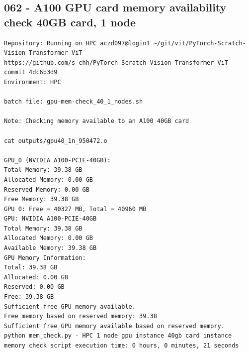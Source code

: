 \subsection{062 - A100 GPU card memory availability check 40GB card, 1 node}
\label{app_res:062}
\begin{verbatim}
Repository: Running on HPC aczd097@login1 ~/git/vit/PyTorch-Scratch-Vision-Transformer-ViT
https://github.com/s-chh/PyTorch-Scratch-Vision-Transformer-ViT
commit 4dc6b3d9
Environment: HPC

batch file: gpu-mem-check_40_1_nodes.sh

Note: Checking memory available to an A100 40GB card 

cat outputs/gpu40_1n_950472.o

GPU_0 (NVIDIA A100-PCIE-40GB):
Total Memory: 39.38 GB
Allocated Memory: 0.00 GB
Reserved Memory: 0.00 GB
Free Memory: 39.38 GB
GPU 0: Free = 40327 MB, Total = 40960 MB
GPU: NVIDIA A100-PCIE-40GB
Total Memory: 39.38 GB
Allocated Memory: 0.00 GB
Available Memory: 39.38 GB
GPU Memory Information:
Total: 39.38 GB
Allocated: 0.00 GB
Reserved: 0.00 GB
Free: 39.38 GB
Sufficient free GPU memory available.
Free memory based on reserved memory: 39.38
Sufficient free GPU memory available based on reserved memory.
python mem_check.py - HPC 1 node gpu instance 40gb card instance memory check script execution time: 0 hours, 0 minutes, 21 seconds
            
\end{verbatim}

